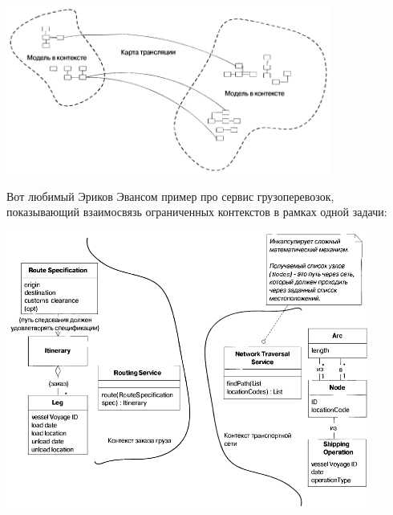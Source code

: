 \documentclass{../../text-style}
\begin{document}
\begin{center}
    \includegraphics[width=0.8\textwidth]{contextMap.png}
\end{center}

Вот любимый Эриков Эвансом пример про сервис грузоперевозок, показывающий взаимосвязь ограниченных контекстов в рамках одной задачи: 

\begin{center}
    \includegraphics[width=0.9\textwidth]{contextBoundariesExample.png}
\end{center}
\end{document}

